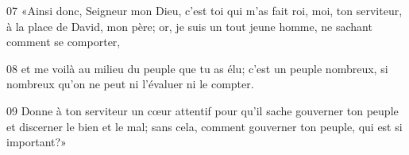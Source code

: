 
07 «Ainsi donc, Seigneur mon Dieu, c’est toi qui m’as fait roi, moi, ton serviteur, à la place de David, mon père; or, je suis un tout jeune homme, ne sachant comment se comporter,

08 et me voilà au milieu du peuple que tu as élu; c’est un peuple nombreux, si nombreux qu’on ne peut ni l’évaluer ni le compter.

09 Donne à ton serviteur un cœur attentif pour qu’il sache gouverner ton peuple et discerner le bien et le mal; sans cela, comment gouverner ton peuple, qui est si important?»
